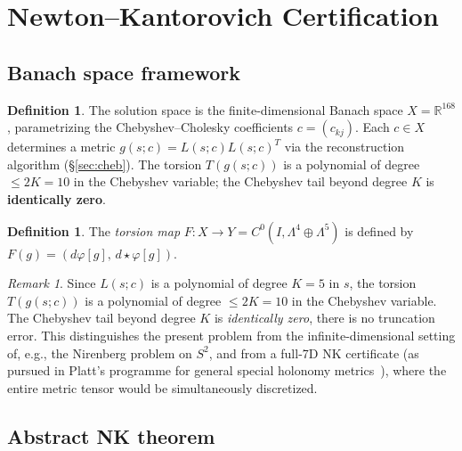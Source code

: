 \documentclass[11pt,a4paper]{article}
\theoremstyle{definition}
\newtheorem{definition}[theorem]{Definition}
\theoremstyle{remark}
\newtheorem{remark}[theorem]{Remark}
\newcommand{\RR}{\mathbb{R}}
\begin{document}
\section{Newton--Kantorovich Certification}\label{sec:nk}

\subsection{Banach space framework}

\begin{definition}\label{def:banach}
The solution space is the finite-dimensional Banach space $X = \RR^{168}$, parametrizing the Chebyshev--Cholesky coefficients $c = (c_{kj})$. Each $c \in X$ determines a metric $g(s; c) = L(s; c) L(s; c)^T$ via the reconstruction algorithm (§\ref{sec:cheb}). The torsion $T(g(s; c))$ is a polynomial of degree $\leq 2K = 10$ in the Chebyshev variable; the Chebyshev tail beyond degree $K$ is \textbf{identically zero}.
\end{definition}

\begin{definition}\label{def:torsion_map}
The \emph{torsion map} $F: X \to Y = C^0(I, \Lambda^4 \oplus \Lambda^5)$ is defined by $F(g) = (d\varphi[g],\, d\star\varphi[g])$.
\end{definition}

\begin{remark}
Since $L(s; c)$ is a polynomial of degree $K = 5$ in $s$, the torsion $T(g(s; c))$ is a polynomial of degree $\leq 2K = 10$ in the Chebyshev variable. The Chebyshev tail beyond degree $K$ is \emph{identically zero}, there is no truncation error. This distinguishes the present problem from the infinite-dimensional setting of, e.g., the Nirenberg problem on $S^2$, and from a full-7D NK certificate (as pursued in Platt's programme for general special holonomy metrics~\cite{Platt2026}), where the entire metric tensor would be simultaneously discretized.
\end{remark}

\subsection{Abstract NK theorem}
\end{document}
